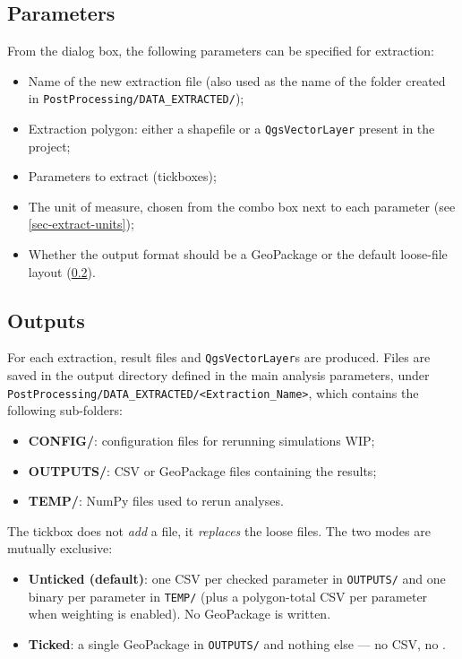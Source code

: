 \subsection{Parameters}
\label{sec-extract-params}
From the dialog box, the following parameters can be specified for extraction:
\begin{itemize}
    \item Name of the new extraction file (also used as the name of the folder created in \texttt{PostProcessing/DATA\_EXTRACTED/});
    \item Extraction polygon: either a shapefile or a \texttt{QgsVectorLayer} present in the project;
    \item Parameters to extract (tickboxes);
    \item The unit of measure, chosen from the combo box next to each parameter (see \cref{sec-extract-units});
    \item Whether the output format should be a GeoPackage or the default loose-file layout (\cref{sec-extract-outputs}).
\end{itemize}

\subsection{Outputs}
\label{sec-extract-outputs}
For each extraction, result files and \texttt{QgsVectorLayer}s are produced. Files are saved in the output directory defined in the main analysis parameters, under
\texttt{PostProcessing/DATA\_EXTRACTED/<Extraction\_Name>}, which contains the following sub-folders:
\begin{itemize}
    \item \textbf{CONFIG/}: configuration files for rerunning simulations WIP;
    \item \textbf{OUTPUTS/}: CSV or GeoPackage files containing the results;
    \item \textbf{TEMP/}: NumPy files used to rerun analyses.
\end{itemize}

The  tickbox does not \emph{add} a file, it \emph{replaces} the loose files. The two modes are mutually exclusive:
\begin{itemize}
    \item \textbf{Unticked (default)}: one CSV per checked parameter in \texttt{OUTPUTS/} and one  binary per parameter in \texttt{TEMP/} (plus a polygon-total CSV per parameter when weighting is enabled). No GeoPackage is written.
    \item \textbf{Ticked}: a single GeoPackage in \texttt{OUTPUTS/} and nothing else --- no CSV, no .
\end{itemize}

